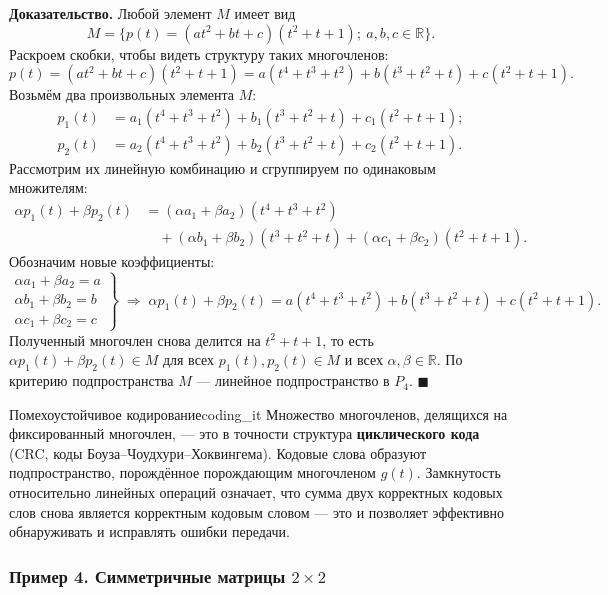 \documentclass[12pt,a4paper]{article}
\newenvironment{myproof}{\noindent\textbf{Доказательство.}}{\hfill$\blacksquare$}
\begin{document}
\begin{myproof}
Любой элемент $M$ имеет вид
\[
M = \{ p(t) = (at^2 + bt + c)(t^2 + t + 1);\ a, b, c \in \mathbb{R} \}.
\]
Раскроем скобки, чтобы видеть структуру таких многочленов:
\[
p(t) = (at^2 + bt + c)(t^2 + t + 1)
= a(t^4 + t^3 + t^2) + b(t^3 + t^2 + t) + c(t^2 + t + 1).
\]
Возьмём два произвольных элемента $M$:
\begin{align*}
p_1(t) &= a_1(t^4 + t^3 + t^2) + b_1(t^3 + t^2 + t) + c_1(t^2 + t + 1); \\
p_2(t) &= a_2(t^4 + t^3 + t^2) + b_2(t^3 + t^2 + t) + c_2(t^2 + t + 1).
\end{align*}
Рассмотрим их линейную комбинацию и сгруппируем по одинаковым множителям:
\begin{align*}
\alpha p_1(t) + \beta p_2(t)
&= (\alpha a_1 + \beta a_2)(t^4 + t^3 + t^2) \\
&\quad + (\alpha b_1 + \beta b_2)(t^3 + t^2 + t)
+ (\alpha c_1 + \beta c_2)(t^2 + t + 1).
\end{align*}
Обозначим новые коэффициенты:
\[
\left.
\begin{array}{l}
\alpha a_1 + \beta a_2 = a \\
\alpha b_1 + \beta b_2 = b \\
\alpha c_1 + \beta c_2 = c
\end{array}
\right\}
\;\Rightarrow\;
\alpha p_1(t) + \beta p_2(t)
= a(t^4 + t^3 + t^2) + b(t^3 + t^2 + t) + c(t^2 + t + 1).
\]
Полученный многочлен снова делится на $t^2 + t + 1$, то есть
$\alpha p_1(t) + \beta p_2(t) \in M$ для всех
$p_1(t), p_2(t) \in M$ и всех $\alpha, \beta \in \mathbb{R}$.
По критерию подпространства $M$ — линейное подпространство в $P_4$.
\end{myproof}

\begin{remarkIT}{Помехоустойчивое кодирование}{coding_it}
Множество многочленов, делящихся на фиксированный многочлен, — это в
точности структура \textbf{циклического кода} (CRC, коды
Боуза–Чоудхури–Хоквингема). Кодовые слова образуют подпространство,
порождённое порождающим многочленом $g(t)$. Замкнутость относительно
линейных операций означает, что сумма двух корректных кодовых слов
снова является корректным кодовым словом — это и позволяет эффективно
обнаруживать и исправлять ошибки передачи.
\end{remarkIT}

\subsubsection*{Пример 4. Симметричные матрицы $2\times 2$}
\end{document}
